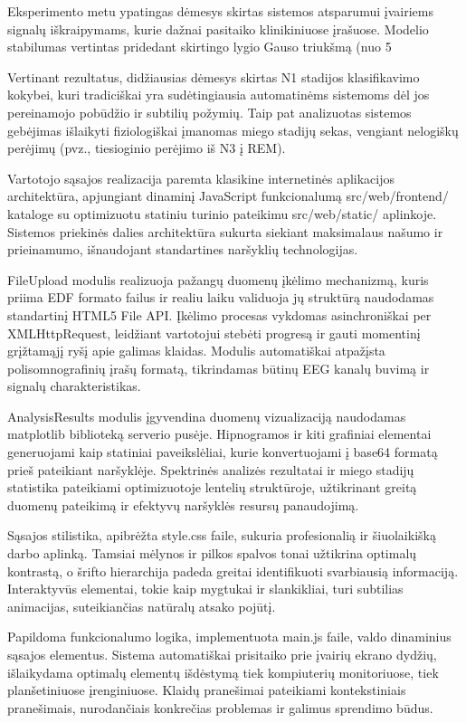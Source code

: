 Eksperimento metu ypatingas dėmesys skirtas sistemos atsparumui įvairiems signalų iškraipymams, kurie dažnai pasitaiko klinikiniuose įrašuose. Modelio stabilumas vertintas pridedant skirtingo lygio Gauso triukšmą (nuo 5%

Vertinant rezultatus, didžiausias dėmesys skirtas N1 stadijos klasifikavimo kokybei, kuri tradiciškai yra sudėtingiausia automatinėms sistemoms dėl jos pereinamojo pobūdžio ir subtilių požymių. Taip pat analizuotas sistemos gebėjimas išlaikyti fiziologiškai įmanomas miego stadijų sekas, vengiant nelogiškų perėjimų (pvz., tiesioginio perėjimo iš N3 į REM). 

Vartotojo sąsajos realizacija paremta klasikine internetinės aplikacijos architektūra, apjungiant dinaminį JavaScript funkcionalumą src/web/frontend/ kataloge su optimizuotu statiniu turinio pateikimu src/web/static/ aplinkoje. Sistemos priekinės dalies architektūra sukurta siekiant maksimalaus našumo ir prieinamumo, išnaudojant standartines naršyklių technologijas.

FileUpload modulis realizuoja pažangų duomenų įkėlimo mechanizmą, kuris priima EDF formato failus ir realiu laiku validuoja jų struktūrą naudodamas standartinį HTML5 File API. Įkėlimo procesas vykdomas asinchroniškai per XMLHttpRequest, leidžiant vartotojui stebėti progresą ir gauti momentinį grįžtamąjį ryšį apie galimas klaidas. Modulis automatiškai atpažįsta polisomnografinių įrašų formatą, tikrindamas būtinų EEG kanalų buvimą ir signalų charakteristikas.

AnalysisResults modulis įgyvendina duomenų vizualizaciją naudodamas matplotlib biblioteką serverio pusėje. Hipnogramos ir kiti grafiniai elementai generuojami kaip statiniai paveikslėliai, kurie konvertuojami į base64 formatą prieš pateikiant naršyklėje. Spektrinės analizės rezultatai ir miego stadijų statistika pateikiami optimizuotoje lentelių struktūroje, užtikrinant greitą duomenų pateikimą ir efektyvų naršyklės resursų panaudojimą.

Sąsajos stilistika, apibrėžta style.css faile, sukuria profesionalią ir šiuolaikišką darbo aplinką. Tamsiai mėlynos ir pilkos spalvos tonai užtikrina optimalų kontrastą, o šrifto hierarchija padeda greitai identifikuoti svarbiausią informaciją. Interaktyvūs elementai, tokie kaip mygtukai ir slankikliai, turi subtilias animacijas, suteikiančias natūralų atsako pojūtį.

Papildoma funkcionalumo logika, implementuota main.js faile, valdo dinaminius sąsajos elementus. Sistema automatiškai prisitaiko prie įvairių ekrano dydžių, išlaikydama optimalų elementų išdėstymą tiek kompiuterių monitoriuose, tiek planšetiniuose įrenginiuose. Klaidų pranešimai pateikiami kontekstiniais pranešimais, nurodančiais konkrečias problemas ir galimus sprendimo būdus. 